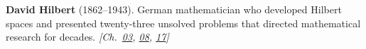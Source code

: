 \textbf{David Hilbert} (1862–1943). German mathematician who developed Hilbert spaces and presented twenty-three unsolved problems that directed mathematical research for decades. \emph{[Ch.~\hyperref[ch:banach]{03}, \hyperref[ch:boundedprimegaps]{08}, \hyperref[ch:bignumbers]{17}]}

